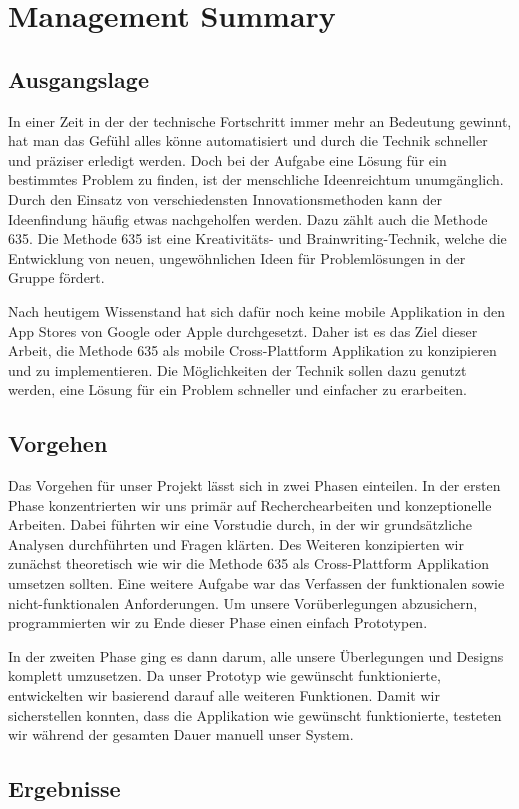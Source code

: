 \section{Management Summary}

\subsection{Ausgangslage}
In einer Zeit in der der technische Fortschritt immer mehr an Bedeutung gewinnt, hat man das Gefühl alles könne automatisiert und durch die Technik schneller und präziser erledigt werden. Doch bei der Aufgabe eine Lösung für ein bestimmtes Problem zu finden, ist der menschliche Ideenreichtum unumgänglich. Durch den Einsatz von verschiedensten Innovationsmethoden kann der Ideenfindung häufig etwas nachgeholfen werden. Dazu zählt auch die Methode 635. Die Methode 635 ist eine Kreativitäts- und Brainwriting-Technik, welche die Entwicklung von neuen, ungewöhnlichen Ideen für Problemlösungen in der Gruppe fördert.

Nach heutigem Wissenstand hat sich dafür noch keine mobile Applikation in den App Stores von Google oder Apple durchgesetzt. Daher ist es das Ziel dieser Arbeit, die Methode 635 als mobile Cross-Plattform Applikation zu konzipieren und zu implementieren. Die Möglichkeiten der Technik sollen dazu genutzt werden, eine Lösung für ein Problem schneller und einfacher zu erarbeiten.

\subsection{Vorgehen}
Das Vorgehen für unser Projekt lässt sich in zwei Phasen einteilen. In der ersten Phase konzentrierten wir uns primär auf Recherchearbeiten und konzeptionelle Arbeiten. Dabei führten wir eine Vorstudie durch, in der wir grundsätzliche Analysen durchführten und Fragen klärten. Des Weiteren konzipierten wir zunächst theoretisch wie wir die Methode 635 als Cross-Plattform Applikation umsetzen sollten. Eine weitere Aufgabe war das Verfassen der funktionalen sowie nicht-funktionalen Anforderungen. Um unsere Vorüberlegungen abzusichern, programmierten wir zu Ende dieser Phase einen einfach Prototypen.

In der zweiten Phase ging es dann darum, alle unsere Überlegungen und Designs komplett umzusetzen. Da unser Prototyp wie gewünscht funktionierte, entwickelten wir basierend darauf alle weiteren Funktionen. Damit wir sicherstellen konnten, dass die Applikation wie gewünscht funktionierte, testeten wir während der gesamten Dauer manuell unser System.

\subsection{Ergebnisse}
